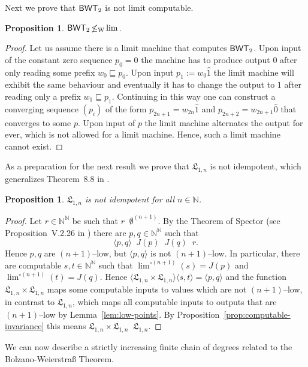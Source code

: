 \documentclass[a4paper]{amsart}
\def\IN{{\mathbb{N}}}
\def\Low{\mathfrak{L}}
\def\prefix{\sqsubseteq}
\def\Baire{{\IN^\IN}}
\def\BWT{\text{\rm\sffamily BWT}}
\def\equivT{\mathop{\equiv_{\mathrm{T}}}}
\def\nleqW{\mathop{\not\leq_{\mathrm{W}}}}
\newtheorem{proposition}[theorem]{Proposition}
\theoremstyle{definition}
\begin{document}
Next we prove that $\BWT_2$ is not limit computable. 

\begin{proposition}
\label{prop:BWT-2}
$\BWT_2\nleqW\lim$.
\end{proposition}
\begin{proof}
Let us assume there is a limit machine that computes $\BWT_2$. Upon input of
the constant zero sequence $p_0=\widehat{0}$ the machine has to produce
output $0$ after only reading some prefix $w_0\prefix p_0$.
Upon input $p_1:=w_0\widehat{1}$ the limit machine will exhibit the same behaviour
and eventually it has to change the output to $1$ after reading only a prefix $w_1\prefix p_1$.
Continuing in this way one can construct a converging sequence $(p_i)$ 
of the form $p_{2n+1}=w_{2n}\widehat{1}$ and $p_{2n+2}=w_{2n+1}\widehat{0}$
that converges to some $p$.
Upon input of $p$ the limit machine alternates the output for ever, which is not allowed
for a limit machine. Hence, such a limit machine cannot exist.
\end{proof}

As a preparation for the next result we prove that $\Low_{1,n}$ is not idempotent, 
which generalizes Theorem~8.8 in \cite{BBP}.

\begin{proposition}
\label{prop:low-idempotent}
$\Low_{1,n}$ is not idempotent for all $n\in\IN$.
\end{proposition}
\begin{proof}
Let $r\in\Baire$ be such that $r\equivT\emptyset^{(n+1)}$. 
By the Theorem of Spector (see Proposition~V.2.26 in \cite{Odi89})
there are $p,q\in\Baire$ such that
\[\langle p,q\rangle\equivT J(p)\equivT J(q)\equivT r.\]
Hence $p,q$ are $(n+1)$--low, but $\langle p,q\rangle$ is not $(n+1)$--low.
In particular, there are computable $s,t\in\Baire$ such that $\lim^{\circ(n+1)}(s)=J(p)$ and $\lim^{\circ(n+1)}(t)=J(q)$.
Hence $\langle\Low_{1,n}\times\Low_{1,n}\rangle\langle s,t\rangle=\langle p,q\rangle$ and the function
$\Low_{1,n}\times\Low_{1,n}$ maps some computable inputs to values which are not $(n+1)$--low,
in contrast to $\Low_{1,n}$, which maps all computable inputs to outputs that are $(n+1)$--low
by Lemma~\ref{lem:low-points}. By Proposition~\ref{prop:computable-invariance} this means  
$\Low_{1,n}\times\Low_{1,n}\nleqW\Low_{1,n}$.
\end{proof}

We can now describe a strictly increasing finite chain of degrees related to the Bolzano-Weierstra\ss{} Theorem.
\end{document}
